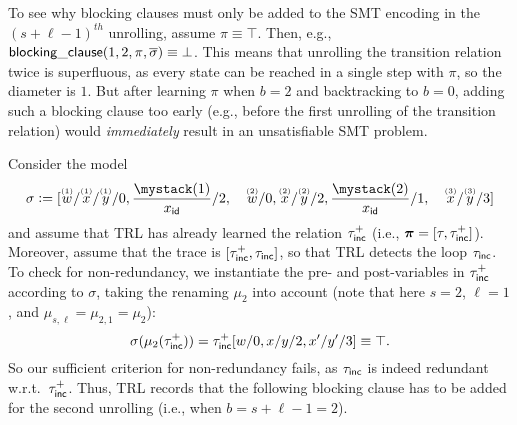 \begin{remark}
To see why blocking clauses must only be added to the SMT encoding
in the $(s+\ell-1)^{th}$ unrolling, assume $\pi \equiv \top$.
%
Then, e.g., $\mathsf{blocking\_clause}(1,2,\pi,\overline{\sigma}) \equiv \bot$.
%
This means that unrolling the transition relation twice is superfluous, as every state can be reached in a single step with $\pi$, so the diameter is $1$.
%
But after learning $\pi$ when $b=2$ and backtracking to $b=0$, adding such a blocking clause too early (e.g., before the first unrolling of the transition relation) would \emph{immediately} result in an unsatisfiable SMT problem.
\end{remark}


\begin{example}
  \label{ex:redundant}
  Consider the model
  \[
    \sigma \Def [\ind{w}{1}/\ind{x}{1}/\ind{y}{1}/0,\ind[\id]{x}{1}/2, \quad
      \ind{w}{2}/0,\ind{x}{2}/\ind{y}{2}/2,\ind[\id]{x}{2}/1, \quad
      \ind{x}{3}/\ind{y}{3}/3]
  \]
  and assume that TRL has already learned the relation $\tau^+_{\mathsf{inc}}$ (i.e., $\bm{\mathrm{\pi}} = [\tau,\tau^+_{\mathsf{inc}}]$).
  Moreover, assume that the trace is $[\tau^+_{\mathsf{inc}},\tau_{\mathsf{inc}}]$, so that TRL detects the loop $\tau_{\mathsf{inc}}$.
  To check for non-redundancy, we instantiate the pre- and post-variables in $\tau^+_{\mathsf{inc}}$ according to $\sigma$, taking the renaming $\mu_{2}$ into account (note that here $s = 2$, $\ell = 1$, and $\mu_{s,\ell} = \mu_{2,1} = \mu_2$):
  \[
    \sigma(\mu_{2}(\tau^+_{\mathsf{inc}})) = \tau^+_{\mathsf{inc}}[w/0,x/y/2,x'/y'/3] \equiv \top.
  \]
  So our sufficient criterion for non-redundancy fails, as $\tau_{\mathsf{inc}}$ is indeed redundant w.r.t.\ $\tau^+_{\mathsf{inc}}$.
  Thus, TRL records that the following blocking clause has to be added for the second unrolling (i.e., when $b = s + \ell -1 = 2$).
\end{example}
